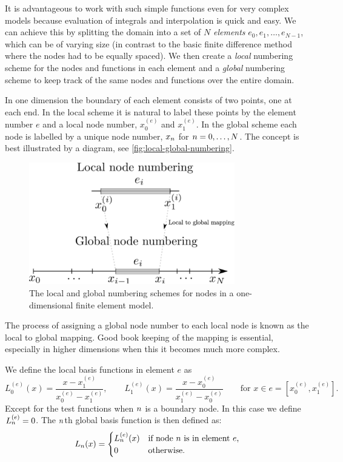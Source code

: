 It is advantageous to work with such simple functions even for very complex
models because evaluation of integrals and interpolation is quick and easy. We
can achieve this by splitting the domain into a set of $N$ \emph{elements}
$e_{0},e_{1},\ldots,e_{N-1}$, which can be of varying size (in contrast to the
basic finite difference method where the nodes had to be equally spaced). We
then create a \emph{local} numbering scheme for the nodes and functions in each
element and a \emph{global} numbering scheme to keep track of the same nodes and
functions over the entire domain.

In one dimension the boundary of each element consists of two points, one at
each end. In the local scheme it is natural to label these points by the element
number $e$ and a local node number, \ie $x_{0}^{(e)}$ and $x_{1}^{(e)}$. In the
global scheme each node is labelled by a unique node number, \ie $x_{n}$ for $n=0,\ldots,N$.
The concept is best illustrated by a diagram, see \autoref{fig:local-global-numbering}.

\begin{figure}
  \center
  \includegraphics[width=0.8\textwidth]{./images/local_global_numbering}
  \caption{The local and global numbering schemes for nodes in a one-dimensional
    finite element model.}
  \label{fig:local-global-numbering}
\end{figure}

The process of assigning a global node number to each local node is known as the
local to global mapping. Good book keeping of the mapping is essential,
especially in higher dimensions when this it becomes much more complex.

We define the local basis functions in element $e$ as
\begin{equation}
  L_{0}^{(e)}(x)=\dfrac{x-x_{1}^{(e)}}{x_{0}^{(e)}-x_{1}^{(e)}},\qquad
  L_{1}^{(e)}(x)=\dfrac{x-x_{0}^{(e)}}{x_{1}^{(e)}-x_{0}^{(e)}}
  \qquad\text{for }x\in e=[x_{0}^{(e)},x_{1}^{(e)}].
  \label{eq:32}
\end{equation}
Except for the test functions when $n$ is a boundary node. In this case we define $L_n^{(e)} = 0$.
The $n$th global basis function is then defined as:
\begin{equation}
  \label{eq:33}
  L_n(x) =
  \begin{cases}
    L_n^{(e)}(x) & \text{if node $n$ is in element $e$,} \\
    0 & \text{otherwise.}
  \end{cases}
\end{equation}

